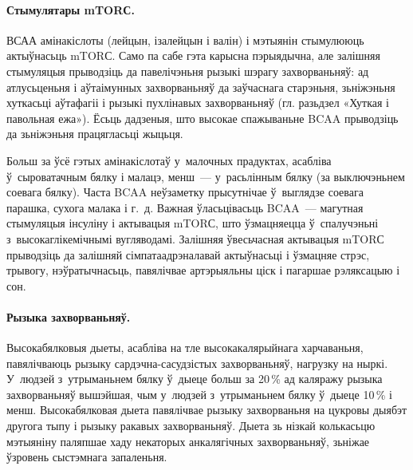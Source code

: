 
\paragraph{Стымулятары mTORС.}
ВСАА амінакіслоты (лейцын, ізалейцын і валін) і мэтыянін стымулююць актыўнасьць mTORС. Само па сабе гэта карысна пэрыядычна, але залішняя стымуляцыя прыводзіць да павелічэньня рызыкі шэрагу захворваньняў: ад атлусьценьня і аўтаімунных захворваньняў да заўчаснага старэньня, зьніжэньня хуткасьці аўтафагіі і рызыкі пухлінавых захворваньняў (гл. разьдзел «Хуткая і павольная ежа»). Ёсьць дадзеныя, што высокае спажываньне BCAA прыводзіць да зьніжэньня працягласьці жыцьця.

Больш за ўсё гэтых амінакіслотаў у~малочных прадуктах, асабліва ў~сыроватачным бялку і малацэ, менш~--- у~расьлінным бялку (за выключэньнем соевага бялку). Часта BCAA неўзаметку прысутнічае ў~выглядзе соевага парашка, сухога малака і г.~д. Важная ўласьцівасьць BCAA~--- магутная стымуляцыя інсуліну і актывацыя mTORС, што ўзмацняецца ў~спалучэньні з~высокаглікемічнымі вугляводамі. Залішняя ўвесьчасная актывацыя mTORС прыводзіць да залішняй сімпатаадрэналавай актыўнасьці і ўзмацняе стрэс, трывогу, нэўратычнасьць, павялічвае артэрыяльны ціск і пагаршае рэляксацыю і сон.

\paragraph{Рызыка захворваньняў.}
Высокабялковыя дыеты, асабліва на тле высокакалярыйнага харчаваньня, павялічваюць рызыку сар\-дэч\-на-сасудзістых захворваньняў, нагрузку на ныркі. У~людзей з~утрыманьнем бялку ў~дыеце больш за 20\,\% ад каляражу рызыка захворваньняў вышэйшая, чым у~людзей з~утрыманьнем бялку ў~дыеце 10\,\% і менш. Высокабялковая дыета павялічвае рызыку захворваньня на цукровы дыябэт другога тыпу і рызыку ракавых захворваньняў. Дыета зь нізкай колькасьцю мэтыяніну паляпшае хаду некаторых анкалягічных захворваньняў, зьніжае ўзровень сыстэмнага запаленьня.

